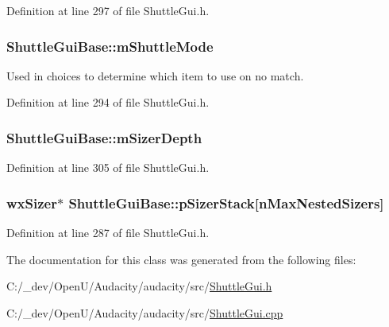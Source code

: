 Definition at line 297 of file Shuttle\+Gui.\+h.

\subsubsection[{\texorpdfstring{m\+Shuttle\+Mode}{mShuttleMode}}]{ Shuttle\+Gui\+Base\+::m\+Shuttle\+Mode\hspace{0.3cm}{\ttfamily [protected]}}\hypertarget{class_shuttle_gui_base_af1822d58f1e11d43b98522b063c6b519}{}\label{class_shuttle_gui_base_af1822d58f1e11d43b98522b063c6b519}


Used in choices to determine which item to use on no match. 



Definition at line 294 of file Shuttle\+Gui.\+h.

\subsubsection[{\texorpdfstring{m\+Sizer\+Depth}{mSizerDepth}}]{ Shuttle\+Gui\+Base\+::m\+Sizer\+Depth\hspace{0.3cm}{\ttfamily [protected]}}\hypertarget{class_shuttle_gui_base_a6329ff4e44e13ca2f5d7aaea1584481c}{}\label{class_shuttle_gui_base_a6329ff4e44e13ca2f5d7aaea1584481c}


Definition at line 305 of file Shuttle\+Gui.\+h.

\subsubsection[{\texorpdfstring{p\+Sizer\+Stack}{pSizerStack}}]{\setlength{\rightskip}{0pt plus 5cm}wx\+Sizer$\ast$ Shuttle\+Gui\+Base\+::p\+Sizer\+Stack\mbox{[}{\bf n\+Max\+Nested\+Sizers}\mbox{]}\hspace{0.3cm}{\ttfamily [protected]}}\hypertarget{class_shuttle_gui_base_aecb78352e89e697636aa26f4183fd4e9}{}\label{class_shuttle_gui_base_aecb78352e89e697636aa26f4183fd4e9}


Definition at line 287 of file Shuttle\+Gui.\+h.



The documentation for this class was generated from the following files\+:\begin{DoxyCompactItemize}
\item 
C\+:/\+\_\+dev/\+Open\+U/\+Audacity/audacity/src/\hyperlink{_shuttle_gui_8h}{Shuttle\+Gui.\+h}\item 
C\+:/\+\_\+dev/\+Open\+U/\+Audacity/audacity/src/\hyperlink{_shuttle_gui_8cpp}{Shuttle\+Gui.\+cpp}\end{DoxyCompactItemize}
